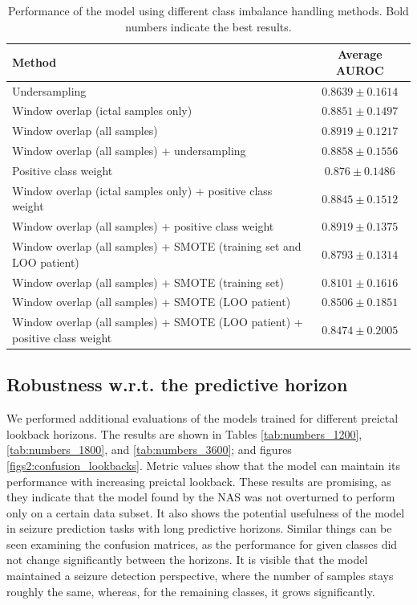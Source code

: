 \documentclass[a4paper,fleqn]{cas-sc}
\begin{document}
\begin{table}[H]
\centering
\begin{tabular}{l||c}

\textbf{Method} & \textbf{Average AUROC} \\
\hline
Undersampling & $0.8639 \pm 0.1614$ \\
Window overlap (ictal samples only) & $0.8851 \pm 0.1497$ \\
Window overlap (all samples) & $\mathbf{0.8919 \pm 0.1217}$ \\
Window overlap (all samples) + undersampling & $0.8858 \pm 0.1556$ \\
Positive class weight & $0.876 \pm 0.1486$ \\
Window overlap (ictal samples only) + positive class weight & $0.8845 \pm 0.1512$ \\
Window overlap (all samples) + positive class weight & $\mathbf{0.8919 \pm 0.1375}$ \\
Window overlap (all samples) + SMOTE  (training set and LOO patient) & $0.8793 \pm 0.1314$ \\
Window overlap (all samples) + SMOTE  (training set) & $0.8101 \pm 0.1616$ \\
Window overlap (all samples) + SMOTE (LOO patient) & $0.8506 \pm 0.1851$ \\
Window overlap (all samples) + SMOTE (LOO patient) + positive class weight & $0.8474 \pm 0.2005$ \\

\end{tabular}
\caption{Performance of the model using different class imbalance handling methods. Bold numbers indicate the best results.}\label{tab:balancing-results}
\end{table}

\subsection{Robustness w.r.t. the predictive horizon}

We performed additional evaluations of the models trained for different preictal lookback horizons. The results are shown in Tables \ref{tab:numbers_1200}, \ref{tab:numbers_1800}, and \ref{tab:numbers_3600}; and figures \ref{figs2:confusion_lookbacks}. Metric values show that the model can maintain its performance with increasing preictal lookback. These results are promising, as they indicate that the model found by the NAS was not overturned to perform only on a certain data subset. It also shows the potential usefulness of the model in seizure prediction tasks with long predictive horizons. Similar things can be seen examining the confusion matrices, as the performance for given classes did not change significantly between the horizons. It is visible that the model maintained a seizure detection perspective, where the number of samples stays roughly the same, whereas, for the remaining classes, it grows significantly. 
\end{document}

